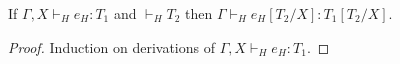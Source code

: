 \begin{lemma}
\label{htes}
If $\Gamma,X\vdash_{H}e_{H}:T_{1}$ and $\vdash_{H}T_{2}$ then $\Gamma\vdash_{H}e_{H}[T_{2}/X]:T_{1}[T_{2}/X]$.
\begin{proof}
Induction on derivations of $\Gamma,X\vdash_{H}e_{H}:T_{1}$.
\end{proof}
\end{lemma}